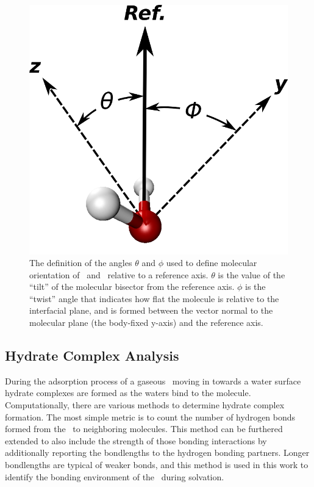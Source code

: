 \begin{figure}[h!]
	\begin{center}
		\includegraphics[scale=1.0]{images/angle-cartoons/wateranglessmall.png}
		\caption{The definition of the angles $\theta$ and $\phi$ used to define molecular orientation of \suldiox~and \wat~relative to a reference axis. $\theta$ is the value of the ``tilt'' of the molecular bisector from the reference axis. $\phi$ is the ``twist'' angle that indicates how flat the molecule is relative to the interfacial plane, and is formed between the vector normal to the molecular plane (the body-fixed y-axis) and the reference axis.}
		\label{fig:water-angles}
	\end{center}
\end{figure}

\subsection{Hydrate Complex Analysis}

	During the adsorption process of a gaseous \suldiox~moving in towards a water surface hydrate complexes are formed as the waters bind to the molecule. Computationally, there are various methods to determine hydrate complex formation. The most simple metric is to count the number of hydrogen bonds formed from the \suldiox~to neighboring molecules. This method can be furthered extended to also include the strength of those bonding interactions by additionally reporting the bondlengths to the hydrogen bonding partners. Longer bondlengths are typical of weaker bonds, and this method is used in this work to identify the bonding environment of the \suldiox~during solvation.

